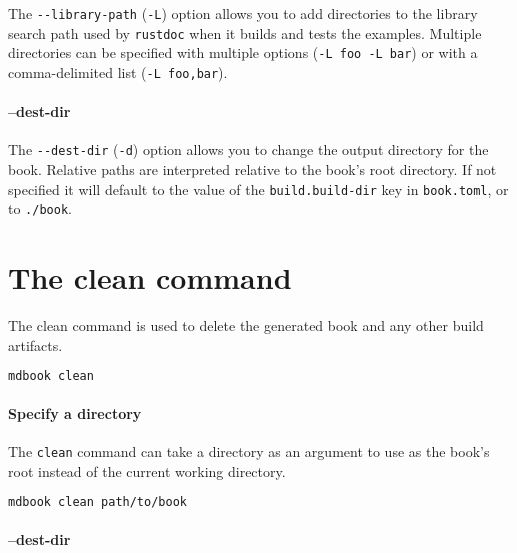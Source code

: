 \documentclass{article}
\begin{document}
The \lstinline|--library-path| (\lstinline|-L|) option allows you to add directories to the library
search path used by \lstinline|rustdoc| when it builds and tests the examples. Multiple
directories can be specified with multiple options (\lstinline|-L foo -L bar|) or with a
comma-delimited list (\lstinline|-L foo,bar|).\\

\paragraph{--dest-dir}
\label{--dest-dir}
\label{dest-dir}

The \lstinline|--dest-dir| (\lstinline|-d|) option allows you to change the output directory for the
book. Relative paths are interpreted relative to the book's root directory. If
not specified it will default to the value of the \lstinline|build.build-dir| key in
\lstinline|book.toml|, or to \lstinline|./book|.\\

\section{The clean command}
\label{The clean command}
\label{the-clean-command}

The clean command is used to delete the generated book and any other build
artifacts.\\
\begin{lstlisting}[language=bash]
mdbook clean

\end{lstlisting}

\paragraph{Specify a directory}
\label{Specify a directory}
\label{specify-a-directory}

The \lstinline|clean| command can take a directory as an argument to use as the book's
root instead of the current working directory.\\
\begin{lstlisting}[language=bash]
mdbook clean path/to/book

\end{lstlisting}

\paragraph{--dest-dir}
\label{--dest-dir}
\label{dest-dir}
\end{document}
